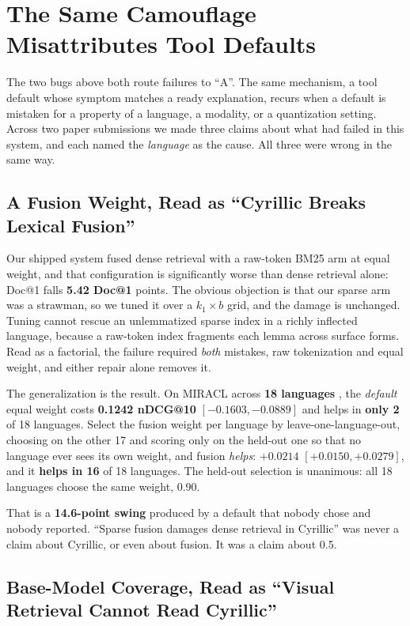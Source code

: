 \documentclass{article}
\begin{document}
\section{The Same Camouflage Misattributes Tool Defaults}
\label{sec:misattribution}

The two bugs above both route failures to ``A''. The same mechanism, a tool default whose symptom matches a ready explanation, recurs when a default is mistaken for a property of a language, a modality, or a quantization setting. Across two paper submissions we made three claims about what had failed in this system, and each named the \emph{language} as the cause. All three were wrong in the same way.

\subsection{A Fusion Weight, Read as ``Cyrillic Breaks Lexical Fusion''}
\label{sec:fusion}

Our shipped system fused dense retrieval with a raw-token BM25 arm at equal weight, and that configuration is significantly worse than dense retrieval alone: Doc@1 falls \textbf{5.42 Doc@1} points. The obvious objection is that our sparse arm was a strawman, so we tuned it over a $k_1 \times b$ grid, and the damage is unchanged. Tuning cannot rescue an unlemmatized sparse index in a richly inflected language, because a raw-token index fragments each lemma across surface forms. Read as a factorial, the failure required \emph{both} mistakes, raw tokenization and equal weight, and either repair alone removes it.

The generalization is the result. On MIRACL across \textbf{18 languages} \cite{zhang2023miracl}, the \emph{default} equal weight costs \textbf{0.1242 nDCG@10} $[-0.1603, -0.0889]$ and helps in \textbf{only 2} of 18 languages. Select the fusion weight per language by leave-one-language-out, choosing on the other 17 and scoring only on the held-out one so that no language ever sees its own weight, and fusion \emph{helps}: $+0.0214$ $[+0.0150, +0.0279]$, and it \textbf{helps in 16} of 18 languages. The held-out selection is unanimous: all 18 languages choose the same weight, 0.90.

That is a \textbf{14.6-point swing} produced by a default that nobody chose and nobody reported. ``Sparse fusion damages dense retrieval in Cyrillic'' was never a claim about Cyrillic, or even about fusion. It was a claim about 0.5.

\subsection{Base-Model Coverage, Read as ``Visual Retrieval Cannot Read Cyrillic''}
\label{sec:visual}
\end{document}
